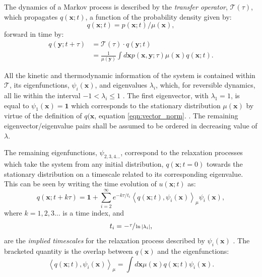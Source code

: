 The dynamics of a Markov process is described by the \emph{transfer operator}, $\mathcal{T}(\tau)$, which propagates $q(\mathbf{x} ; t)$, a function of the probability density given by: \cite{prinzMarkovModelsMolecular2011}
\begin{equation}\label{eqn:vector_norm}
    q(\mathbf{x} ; t) = p(\mathbf{x} ; t)/\mu(\mathbf{x}),
\end{equation}
forward in time by: 
\begin{equation}\label{eqn:transfer_operator}
\begin{split}
   q(\mathbf{y} ; t+\tau) &= \mathcal{T}(\tau) \cdot q(\mathbf{y} ; t) \\
   &=\frac{1}{\mu(\mathbf{y})} \int d \mathbf{x} p(\mathbf{x}, \mathbf{y} ; \tau) \mu(\mathbf{x}) q(\mathbf{x} ; t). 
\end{split}
\end{equation}

All the kinetic and thermodynamic information of the system is contained within $\mathcal{T}$, its eigenfunctions, $\psi_{i}(\mathbf{x})$, and eigenvalues $\lambda_{i}$, which, for reversible dynamics, all lie within the interval $-1 < \lambda_i \le 1$ \cite{schutteDirectApproachConformational1999}. The first eigenvector, with $\lambda_{1}=1$, is equal to $\psi_{1}(\mathbf{x})=\mathbf{1}$ which corresponds to the stationary distribution $\mu(\mathbf{x})$ by virtue of the definition of $q(\mathbf{x}$, equation \ref{eqn:vector_norm}. \cite{prinzMarkovModelsMolecular2011}. The remaining eigenvector/eigenvalue pairs shall be assumed to be ordered in decreasing value of $\lambda$.

The remaining eigenfunctions, $\psi_{2,3,4...}$, correspond to the relaxation processes which take the system from any initial distribution, $q(\mathbf{x} ; t=0)$ towards the stationary distribution on a timescale related to its corresponding eigenvalue.\cite{prinzMarkovModelsMolecular2011} This can be seen by writing the time evolution of $u(\mathbf{x};t)$ as:
\begin{equation}\label{eqn:eig_decomp}
q(\mathbf{x} ; t+k \tau)=\mathbf{1}+\sum_{i=2}^{\infty} e^{-k \tau / t_{i}}\left\langle q(\mathbf{x} ; t), \psi_{i}(\mathbf{x})\right\rangle_{\mu} \psi_{i}(\mathbf{x}),
\end{equation}
where $k=1,2,3 \ldots$ is a time index, and 
\begin{equation}
t_{i}=-\sfrac{\tau}{\ln{|\lambda_{i}|}}, 
\end{equation}
are the \emph{implied timescales} for the relaxation process described by $\psi_{i}(\mathbf{x})$ \cite{prinzMarkovModelsMolecular2011}. The bracketed quantity is the overlap between $q(\mathbf{x})$ and the eigenfunctions:
\begin{equation}
\left\langle q(\mathbf{x} ; t), \psi_{i}(\mathbf{x})\right\rangle_{\mu}=\int d \mathbf{x} \mu(\mathbf{x}) q(\mathbf{x} ; t) \psi_{i}(\mathbf{x}). 
\end{equation}

